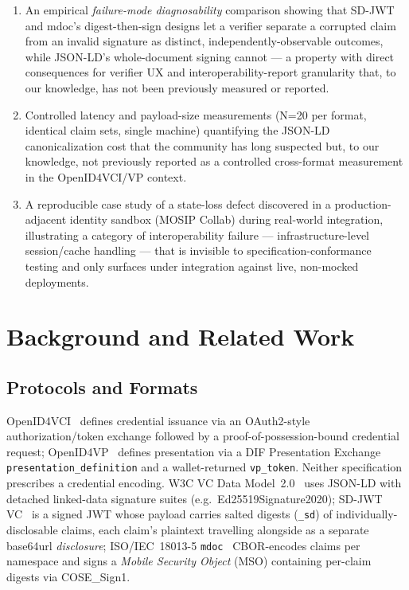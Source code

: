 \documentclass[conference]{IEEEtran}
\begin{document}
\begin{enumerate}
\item An empirical \emph{failure-mode diagnosability} comparison showing that SD-JWT and mdoc's digest-then-sign designs let a verifier separate a corrupted claim from an invalid signature as distinct, independently-observable outcomes, while JSON-LD's whole-document signing cannot --- a property with direct consequences for verifier UX and interoperability-report granularity that, to our knowledge, has not been previously measured or reported.
\item Controlled latency and payload-size measurements (N=20 per format, identical claim sets, single machine) quantifying the JSON-LD canonicalization cost that the community has long suspected but, to our knowledge, not previously reported as a controlled cross-format measurement in the OpenID4VCI/VP context.
\item A reproducible case study of a state-loss defect discovered in a production-adjacent identity sandbox (MOSIP Collab) during real-world integration, illustrating a category of interoperability failure --- infrastructure-level session/cache handling --- that is invisible to specification-conformance testing and only surfaces under integration against live, non-mocked deployments.
\end{enumerate}

\section{Background and Related Work}

\subsection{Protocols and Formats}
OpenID4VCI~\cite{openid4vci} defines credential issuance via an OAuth2-style authorization/token exchange followed by a proof-of-possession-bound credential request; OpenID4VP~\cite{openid4vp} defines presentation via a DIF Presentation Exchange~\cite{dif-pe} \texttt{presentation\_definition} and a wallet-returned \texttt{vp\_token}. Neither specification prescribes a credential encoding. W3C VC Data Model~2.0~\cite{vcdm2} uses JSON-LD with detached linked-data signature suites (e.g.\ Ed25519Signature2020); SD-JWT VC~\cite{sdjwtvc} is a signed JWT whose payload carries salted digests (\texttt{\_sd}) of individually-disclosable claims, each claim's plaintext travelling alongside as a separate base64url \emph{disclosure}; ISO/IEC~18013-5 \texttt{mdoc}~\cite{iso18013-5} CBOR-encodes claims per namespace and signs a \emph{Mobile Security Object} (MSO) containing per-claim digests via COSE\_Sign1.
\end{document}
